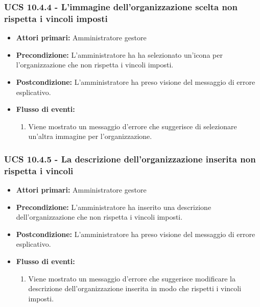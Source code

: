 \subsubsection{UCS 10.4.4 - L'immagine dell'organizzazione scelta non rispetta i vincoli imposti}%
\begin{itemize}
\item \textbf{Attori primari:} Amministratore gestore
\item \textbf{Precondizione:} L'amministratore ha ha selezionato un'icona per l'organizzazione che non rispetta i vincoli imposti.
\item \textbf{Postcondizione:} L'amministratore ha preso visione del messaggio di errore esplicativo.
\item \textbf{Flusso di eventi:}
    \begin{enumerate}
    \item Viene mostrato un messaggio d'errore che suggerisce di selezionare un'altra immagine per l'organizzazione.
    \end{enumerate} 
\end{itemize}

\subsubsection{UCS 10.4.5 - La descrizione dell'organizzazione inserita non rispetta i vincoli}%
\begin{itemize}
\item \textbf{Attori primari:} Amministratore gestore
\item \textbf{Precondizione:} L'amministratore ha inserito una descrizione dell'organizzazione che non rispetta i vincoli imposti.
\item \textbf{Postcondizione:} L'amministratore ha preso visione del messaggio di errore esplicativo.
\item \textbf{Flusso di eventi:}
    \begin{enumerate}
    \item Viene mostrato un messaggio d'errore che suggerisce modificare la descrizione dell'organizzazione inserita in modo che rispetti i vincoli imposti.
    \end{enumerate} 
\end{itemize}

